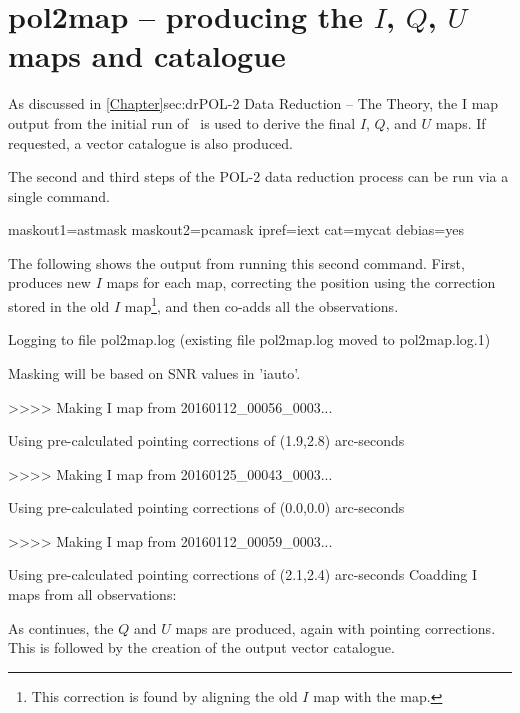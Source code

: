 \section{pol2map -- producing the $I$, $Q$, $U$ maps and catalogue}
\label{sec:how-step23}

As discussed in \cref{Chapter}{sec:dr}{POL-2 Data Reduction -- The
  Theory}, the I map output from the initial run of \poltwomap\ is used to
derive the final $I$, $Q$, and $U$ maps. If requested, a vector catalogue is
also produced.

The second and third steps of the POL-2 data reduction process can be
run via a single command.

\begin{terminalv}
          maskout1=astmask maskout2=pcamask ipref=iext cat=mycat debias=yes
\end{terminalv}

The following shows the output from running this second 
command. First,  produces new $I$ maps for each map, correcting
the position using the correction stored in the old $I$
map\footnote{This correction is found by aligning the old $I$ map with the
 map.}, and then co-adds all the observations.

\begin{terminalv}
Logging to file pol2map.log
(existing file pol2map.log moved to pol2map.log.1)

Masking will be based on SNR values in 'iauto'.

>>>>   Making I map from 20160112_00056_0003...

   Using pre-calculated pointing corrections of (1.9,2.8) arc-seconds

>>>>   Making I map from 20160125_00043_0003...

   Using pre-calculated pointing corrections of (0.0,0.0) arc-seconds

>>>>   Making I map from 20160112_00059_0003...

   Using pre-calculated pointing corrections of (2.1,2.4) arc-seconds
Coadding I maps from all observations:
\end{terminalv}

As  continues, the $Q$ and $U$ maps are produced, again with
pointing corrections. This is followed by the creation of the output
vector catalogue.


